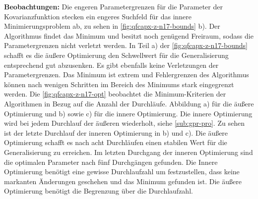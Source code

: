 \textbf{Beobachtungen:} Die engeren Parametergrenzen für die Parameter der Kovarianzfunktion stecken ein engeres Suchfeld für das innere Minimierungsproblem ab, zu sehen in \autoref{fig:qfcapx-z-n17-bounds} b). Der Algorithmus findet das Minimum und besitzt noch genügend Freiraum, sodass die Parametergrenzen nicht verletzt werden. In Teil a) der \autoref{fig:qfcapx-z-n17-bounds} schafft es die äußere Optimierung den Schwellwert für die Generalisierung entsprechend gut abzusenken. Es gibt ebenfalls keine Verletzungen der Parametergrenzen. Das Minimum ist extrem und Fehlergrenzen des Algorithmus können nach wenigen Schritten im Bereich des Minimums stark eingegrenzt werden. Die \autoref{fig:qfcapx-z-n17-opt} beobachtet die Minimum-Kriterien der Algorithmen in Bezug auf die Anzahl der Durchläufe. Abbildung a) für die äußere Optimierung und b) sowie c) für die innere Optimierung. Die innere Optimierung wird bei jedem Durchlauf der äußeren wiederholt, siehe \autoref{sub:gpr-pro}. Zu sehen ist der letzte Durchlauf der inneren Optimierung in b) und c). Die äußere Optimierung schafft es nach acht Durchläufen einen stabilen Wert für die Generalisierung zu erreichen. Im letzten Durchgang der inneren Optimierung sind die optimalen Parameter nach fünf Durchgängen gefunden. Die Innere Optimierung benötigt eine gewisse Durchlaufzahl um festzustellen, dass keine markanten Änderungen geschehen und das Minimum gefunden ist. Die äußere Optimierung benötigt die Begrenzung über die Durchlaufzahl.


